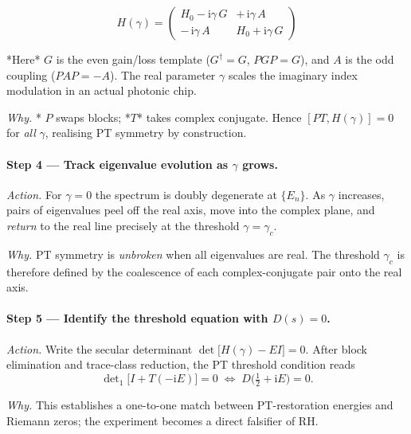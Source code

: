 \documentclass[11pt]{article}
\begin{document}
\[
\boxed{
   H(\gamma)
   =
   \begin{pmatrix}
      H_{0}-\mathrm i\gamma\,G & +\,\mathrm i\gamma\,A \\
      -\,\mathrm i\gamma\,A & H_{0}+\mathrm i\gamma\,G
   \end{pmatrix}}
   \tag{6.1}
\]

*Here* \(G\) is the even gain/loss template
(\(G^{\dagger}=G\), \(PGP=G\)),  
and \(A\) is the odd coupling (\(PAP=-A\)).
The real parameter \(\gamma\) scales the imaginary index modulation in
an actual photonic chip.

\emph{Why.}  
* $P$ swaps blocks; *$T$* takes complex conjugate.
Hence \([PT,H(\gamma)]=0\) for \emph{all} \(\gamma\), realising PT
symmetry by construction.

\vspace{0.4em}
\paragraph{Step 4 — Track eigenvalue evolution as \(\gamma\) grows.}

\emph{Action.}  
For \(\gamma=0\) the spectrum is doubly degenerate at
\(\{E_{n}\}\).  
As $\gamma$ increases, pairs of eigenvalues peel off the real axis,
move into the complex plane, and \emph{return} to the real line
precisely at the threshold \(\gamma=\gamma_{c}\).

\emph{Why.}  
PT symmetry is \emph{unbroken} when all eigenvalues are real.
The threshold \(\gamma_{c}\) is therefore defined by the
coalescence of each complex-conjugate pair onto the real axis.

\vspace{0.4em}
\paragraph{Step 5 — Identify the threshold equation with $D(s)=0$.}

\emph{Action.}  
Write the secular determinant  
\(
   \det\!\bigl[H(\gamma)-E I\bigr]=0.
\)
After block elimination and trace-class reduction, the PT threshold
condition reads
\[
   \det\nolimits_{1}\!\bigl[I+T(-\mathrm iE)\bigr]=0
   \;\Longleftrightarrow\;
   D\!\bigl(\tfrac12+\mathrm iE\bigr)=0 .
\]

\emph{Why.}  
This establishes a one-to-one match between PT-restoration energies
and Riemann zeros; the experiment becomes a direct falsifier of RH.
\end{document}

